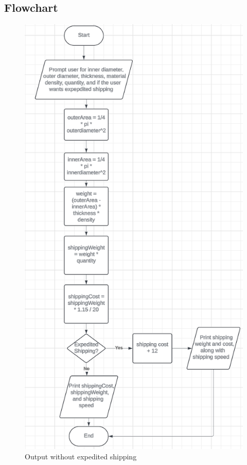 \documentclass{article}
\begin{document}
\begin{flushleft}
	\section{Flowchart}
	\begin{figure}[!h]
		\begin{centering}
			\includegraphics[scale=0.78]{Lab_2_flowchart.png}
			\caption{Output without expedited shipping}
		\end{centering}
	\end{figure}

\end{flushleft}
\end{document}
